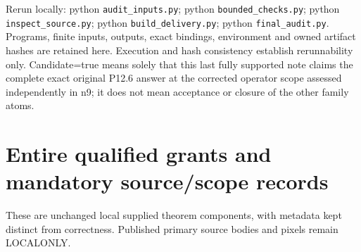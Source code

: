 \documentclass[11pt]{article}
\begin{document}
Rerun locally: python \texttt{audit\_inputs.py}; python \texttt{bounded\_checks.py}; python \texttt{inspect\_source.py}; python \texttt{build\_delivery.py}; python \texttt{final\_audit.py}. Programs, finite inputs, outputs, exact bindings, environment and owned artifact hashes are retained here. Execution and hash consistency establish rerunnability only. Candidate=true means solely that this last fully supported note claims the complete exact original P12.6 answer at the corrected operator scope assessed independently in n9; it does not mean acceptance or closure of the other family atoms.


\appendix
\section{Entire qualified grants and mandatory source/scope records}
These are unchanged local supplied theorem components, with metadata kept distinct from correctness. Published primary source bodies and pixels remain LOCALONLY.
\end{document}
